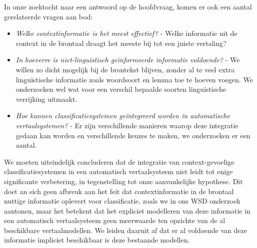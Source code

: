 In onze zoektocht naar een antwoord op de hoofdvraag, komen er ook een aantal gerelateerde vragen aan bod:

\begin{itemize}
\item \emph{Welke contextinformatie is het meest effectief?} - Welke informatie uit de context in de brontaal draagt het
    meeste bij tot een juiste vertaling?
\item \emph{In hoeverre is niet-linguïstisch geïnformeerde informatie voldoende?} - We willen zo dicht mogelijk bij de
    brontekst blijven, zonder al te veel extra linguïstische informatie zoals woordsoort en lemma toe te
    hoeven voegen. We onderzoeken wel wat voor een verschil bepaalde soorten linguïstische verrijking uitmaakt.
\item \emph{Hoe kunnen classificatiesystemen geïntegreerd worden in automatische vertaalsystemen?} - Er zijn
    verschillende manieren waarop deze integratie gedaan kan worden en verschillende keuzes te maken, we onderzoeken er een aantal.
\end{itemize}

We moeten uiteindelijk concluderen dat de integratie van context-gevoelige classificatiesystemen in een automatisch
vertaalsysteem niet leidt tot enige significante verbetering, in tegenstelling tot onze aanvankelijke hypothese. Dit
doet an sich geen afbreuk aan het feit dat contextinformatie in de brontaal nuttige informatie oplevert voor
classificatie, zoals we in ons WSD onderzoek aantonen, maar het betekent dat het expliciet modelleren van deze
informatie in een automatisch vertaalsysteem geen meerwaarde ten opzichte van de al beschikbare vertaalmodellen. We
leiden daaruit af dat er al voldoende van deze informatie impliciet beschikbaar is deze bestaande modellen.

